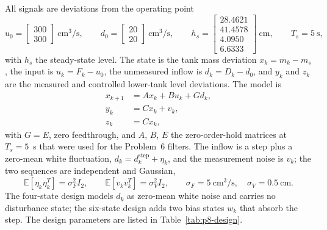 All signals are deviations from the operating point
\begin{equation}
 u_0=\begin{bmatrix}300\\300\end{bmatrix}\ \mathrm{cm^3/s},
 \qquad
 d_0=\begin{bmatrix}20\\20\end{bmatrix}\ \mathrm{cm^3/s},
 \qquad
 h_s=\begin{bmatrix}28.4621\\41.4578\\4.0950\\6.6333\end{bmatrix}\ \mathrm{cm},
 \qquad
 T_s=5\ \mathrm{s},
 \label{eq:p8-operating-point}
\end{equation}
with $h_s$ the steady-state level. The state is the tank mass deviation
$x_k=m_k-m_s$, the input is $u_k=F_k-u_0$, the unmeasured inflow is
$d_k=D_k-d_0$, and $y_k$ and $z_k$ are the measured and controlled lower-tank
level deviations. The model is
\begin{align}
 x_{k+1} &= A x_k + B u_k + G d_k, \label{eq:p8-model-state}\\
 y_k &= C x_k + v_k, \label{eq:p8-model-meas}\\
 z_k &= C x_k, \label{eq:p8-model-out}
\end{align}
with $G=E$, zero feedthrough, and $A$, $B$, $E$ the zero-order-hold
matrices at $T_s=5$~s that were used for the Problem~6 filters.
The inflow is a step plus a zero-mean white fluctuation,
$d_k=d_k^{\mathrm{step}}+\eta_k$, and the measurement noise is $v_k$; the two
sequences are independent and Gaussian,
\begin{equation}
 \mathbb{E}[\eta_k\eta_k^T]=\sigma_F^2 I_2,
 \qquad
 \mathbb{E}[v_kv_k^T]=\sigma_V^2 I_2,
 \qquad
 \sigma_F=5\ \mathrm{cm^3/s},\quad \sigma_V=0.5\ \mathrm{cm}.
 \label{eq:p8-noise}
\end{equation}
The four-state design models $d_k$ as zero-mean white noise and carries no
disturbance state; the six-state design adds two bias states $w_k$ that absorb
the step. The design parameters are listed in Table~\ref{tab:p8-design}.

